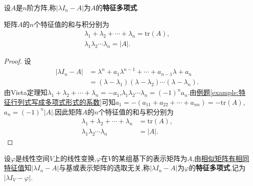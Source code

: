 \documentclass[../../main.tex]{subfiles}
\begin{document}
\begin{definition}[特征多项式]
设$A$是$n$阶方阵,称$|\lambda I_n - A|$为$A$的\textbf{特征多项式}.
\end{definition}

\begin{theorem}[特征值的和与积]\label{theorem:特征值的和与积}
矩阵$A$的$n$个特征值的和与积分别为
\begin{gather*}
\lambda_1 + \lambda_2 + \cdots + \lambda_n = \mathrm{tr}(A), \\
\lambda_1 \lambda_2 \cdots \lambda_n = |A|.
\end{gather*}
\end{theorem}
\begin{proof}
设
\begin{align*}
|\lambda I_n - A| &= \lambda^n + a_1 \lambda^{n-1} + \cdots + a_{n-1} \lambda + a_n \\
&= (\lambda - \lambda_1)(\lambda - \lambda_2) \cdots (\lambda - \lambda_n).
\end{align*}
由Vieta定理知$\lambda_1 + \lambda_2 + \cdots + \lambda_n = -a_1$,$\lambda_1 \lambda_2 \cdots \lambda_n = (-1)^n a_n$.由\hyperref[example:特征行列式写成多项式形式的系数]{例题\ref{example:特征行列式写成多项式形式的系数}}可知$a_1 = -(a_{11} + a_{22} + \cdots + a_{nn}) = -\mathrm{tr}(A)$,$a_n = (-1)^n |A|$.因此矩阵$A$的$n$个特征值的和与积分别为
\begin{align*}
\lambda_1 + \lambda_2 + \cdots + \lambda_n &= \mathrm{tr}(A), \\
\lambda_1 \lambda_2 \cdots \lambda_n &= |A|.
\end{align*}

\end{proof}

\begin{definition}[特征多项式]
设$\varphi$是线性空间$V$上的线性变换,$\varphi$在$V$的某组基下的表示矩阵为$A$,由\hyperref[theorem:相似矩阵有相同特征值]{相似矩阵有相同特征值}知$|\lambda I_n - A|$与基或表示矩阵的选取无关,称$|\lambda I_n - A|$为$\varphi$的\textbf{特征多项式},记为$|\lambda I_V - \varphi|$.
\end{definition}
\end{document}
